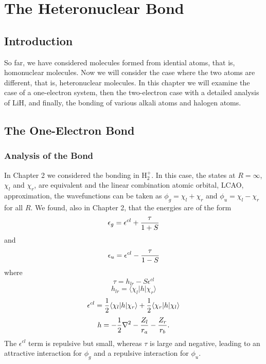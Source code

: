 \chapter{The Heteronuclear Bond}

\section{Introduction}

So far, we have considered molecules formed from idential atoms, that
is, homonuclear molecules.  Now we will consider the case where the two
atoms are different, that is, heteronuclear molecules.   In this 
chapter we will examine the case of a one-electron system, then the 
two-electron case with a detailed analysis of LiH, and finally, 
the bonding of various alkali atoms and halogen atoms.

\section{The One-Electron Bond}
\subsection{Analysis of the Bond}

In Chapter 2 we considered the bonding in H$^+_2$.  In this case, the states
at $R = \infty$, $\chi_l$ and $\chi_r$, are equivalent and the linear 
combination atomic orbital, LCAO, approximation, the wavefunctions can be 
taken as $\phi_g = \chi_l + \chi_r$ and $\phi_u = \chi_l - 
\chi_r$ for all $R$.  We found, also in Chapter 2, that the
energies are of the form
\begin{equation}
\epsilon_g = \epsilon^{cl} + {\tau \over 1 + S}
\end{equation}
and
\begin{equation}
\epsilon_u = \epsilon^{cl} - {\tau \over 1 - S}
\end{equation}
where
\begin{equation}
\tau = h_{lr} - S \epsilon^{cl}
\end{equation}
\begin{equation}
h_{lr} = \langle \chi_l | h | \chi_r \rangle
\end{equation}
\begin{equation}
\epsilon^{cl} = {1 \over 2} \langle \chi_l | h | \chi_r \rangle + {1 
\over 2} \langle \chi_r | h | \chi_l \rangle
\end{equation}
\begin{equation}
h = - {1 \over 2} \nabla^2 - {Z_l \over r_a} - {Z_r \over r_b}.
\end{equation}
The $\epsilon^{cl}$ term is repulsive but small, whereas $\tau$ is large 
and negative, leading to an attractive interaction for $\phi_g$ and a 
repulsive interaction for $\phi_u$.

